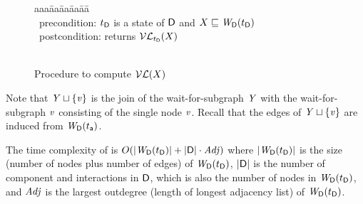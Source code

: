 \begin{figure}[H]
\setcounter{lctr}{0}
\begin{tabbing}\label{alg:compute-lfp}
aaa\= aa\= aa\= aa\= aa\=\kill
\cVL{$\dsk{\act}{\l}, \tD, \XS$}\\
\cmnt\ precondition: $\tD$ is a state of $\dsk{\act}{\l}$ and $X \subg \lwfg{\B}{\tD}{\dsk{\act}{\l}}$\\
\cmnt\ postcondition: returns $\lVFs{\tD}{X}$\\ %
\\
\lio{\YS \gts \ewfg}

\lio{\FORALLC{\ndv \in \dsk{\act}{\l}}}




    \lit{\FI}
\lio{\ENDFOR;}
\lion{\RETURNE{\YS}}
\end{tabbing}
\caption{Procedure to compute $\lVF{X}$}
\label{fig:algcomputeVL}
\end{figure}

Note that $\YS \join \set{\ndv}$ is the join of the wait-for-subgraph $\YS$ with the 
wait-for-subgraph $\ndv$ consisting of the single node $\ndv$. Recall
that the edges of $\YS \join \set{\ndv}$ are induced from $\lwfg{B}{t_\act}{\DS}$.

The time complexity of \cVL{$\DS, \tD, \XS$} is 
$O(\card{\lwfg{\B}{\tD}{\DS}} + \card{\DS} \mult \Adj)$
where
$\card{\lwfg{\B}{\tD}{\DS}}$ is the size (number of nodes plus number of edges) of $\lwfg{\B}{\tD}{\DS}$,
$\card{\DS}$ is the number of component and interactions in $\dsk{\act}{\l}$, which is also the number of nodes in $\lwfg{\B}{\tD}{\DS}$,
and
$\Adj$ is the largest outdegree (\ie length of longest adjacency list) of $\lwfg{\B}{\tD}{\DS}$.

